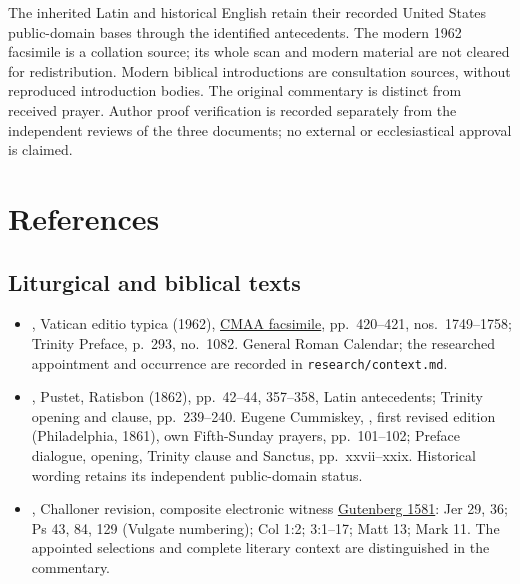 The inherited Latin and historical English retain their recorded United
States public-domain bases through the identified antecedents. The modern
1962 facsimile is a collation source; its whole scan and modern material
are not cleared for redistribution. Modern biblical introductions are
consultation sources, without reproduced introduction bodies. The original
commentary is distinct from received prayer. Author proof verification is
recorded separately from the independent reviews of the three documents;
no external or ecclesiastical approval is claimed.

\section{References}
\subsection{Liturgical and biblical texts}
\begin{itemize}
\item {}, Vatican editio typica (1962),
\href{https://media.churchmusicassociation.org/pdf/missale62.pdf}{CMAA
facsimile}, pp.~420--421, nos.~1749--1758; Trinity Preface,
p.~293, no.~1082. General Roman Calendar; the researched appointment
and occurrence are recorded in \texttt{research/context.md}.
\item {}, Pustet, Ratisbon (1862),
pp.~42--44, 357--358, Latin antecedents; Trinity opening and clause,
pp.~239--240. Eugene Cummiskey, , first revised edition
(Philadelphia, 1861), own Fifth-Sunday prayers, pp.~101--102; Preface dialogue, opening,
Trinity clause and Sanctus, pp.~xxvii--xxix. Historical wording retains
its independent public-domain status.
\item {}, Challoner revision, composite electronic
witness \href{https://www.gutenberg.org/ebooks/1581}{Gutenberg 1581}:
Jer 29, 36; Ps 43, 84, 129 (Vulgate numbering); Col 1:2; 3:1--17;
Matt 13; Mark 11. The appointed selections and complete literary context
are distinguished in the commentary.
\end{itemize}
